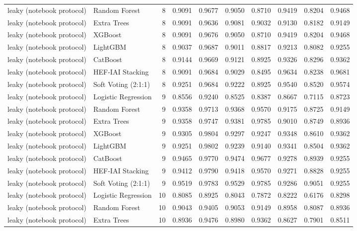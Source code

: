 \begin{tabular}{llrrrrrrrr}
leaky (notebook protocol) & Random Forest & 8 & 0.9091 & 0.9677 & 0.9050 & 0.8710 & 0.9419 & 0.8204 & 0.9468 \\
leaky (notebook protocol) & Extra Trees & 8 & 0.9091 & 0.9636 & 0.9081 & 0.9032 & 0.9130 & 0.8182 & 0.9149 \\
leaky (notebook protocol) & XGBoost & 8 & 0.9091 & 0.9676 & 0.9050 & 0.8710 & 0.9419 & 0.8204 & 0.9468 \\
leaky (notebook protocol) & LightGBM & 8 & 0.9037 & 0.9687 & 0.9011 & 0.8817 & 0.9213 & 0.8082 & 0.9255 \\
leaky (notebook protocol) & CatBoost & 8 & 0.9144 & 0.9669 & 0.9121 & 0.8925 & 0.9326 & 0.8296 & 0.9362 \\
leaky (notebook protocol) & HEF-IAI Stacking & 8 & 0.9091 & 0.9684 & 0.9029 & 0.8495 & 0.9634 & 0.8238 & 0.9681 \\
leaky (notebook protocol) & Soft Voting (2:1:1) & 8 & 0.9251 & 0.9684 & 0.9222 & 0.8925 & 0.9540 & 0.8520 & 0.9574 \\
leaky (notebook protocol) & Logistic Regression & 9 & 0.8556 & 0.9240 & 0.8525 & 0.8387 & 0.8667 & 0.7115 & 0.8723 \\
leaky (notebook protocol) & Random Forest & 9 & 0.9358 & 0.9713 & 0.9368 & 0.9570 & 0.9175 & 0.8725 & 0.9149 \\
leaky (notebook protocol) & Extra Trees & 9 & 0.9358 & 0.9747 & 0.9381 & 0.9785 & 0.9010 & 0.8749 & 0.8936 \\
leaky (notebook protocol) & XGBoost & 9 & 0.9305 & 0.9804 & 0.9297 & 0.9247 & 0.9348 & 0.8610 & 0.9362 \\
leaky (notebook protocol) & LightGBM & 9 & 0.9251 & 0.9802 & 0.9239 & 0.9140 & 0.9341 & 0.8504 & 0.9362 \\
leaky (notebook protocol) & CatBoost & 9 & 0.9465 & 0.9770 & 0.9474 & 0.9677 & 0.9278 & 0.8939 & 0.9255 \\
leaky (notebook protocol) & HEF-IAI Stacking & 9 & 0.9412 & 0.9790 & 0.9418 & 0.9570 & 0.9271 & 0.8828 & 0.9255 \\
leaky (notebook protocol) & Soft Voting (2:1:1) & 9 & 0.9519 & 0.9783 & 0.9529 & 0.9785 & 0.9286 & 0.9051 & 0.9255 \\
leaky (notebook protocol) & Logistic Regression & 10 & 0.8085 & 0.8925 & 0.8043 & 0.7872 & 0.8222 & 0.6176 & 0.8298 \\
leaky (notebook protocol) & Random Forest & 10 & 0.9043 & 0.9405 & 0.9053 & 0.9149 & 0.8958 & 0.8087 & 0.8936 \\
leaky (notebook protocol) & Extra Trees & 10 & 0.8936 & 0.9476 & 0.8980 & 0.9362 & 0.8627 & 0.7901 & 0.8511 \\

\end{tabular}
